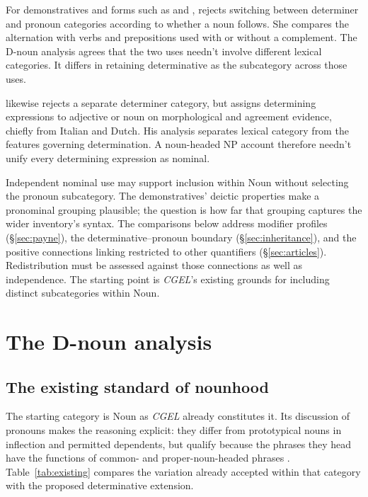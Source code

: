 \documentclass[12pt]{article}
\begin{document}
For demonstratives and forms such as  and , \textcite[140--144]{spinillo2004reconceptualising} rejects switching between determiner and pronoun categories according to whether a noun follows. She compares the alternation with verbs and prepositions used with or without a complement. The D-noun analysis agrees that the two uses needn't involve different lexical categories. It differs in retaining determinative as the subcategory across those uses.

\textcite{vaneynde2003determiner} likewise rejects a separate determiner category, but assigns determining expressions to adjective or noun on morphological and agreement evidence, chiefly from Italian and Dutch. His analysis separates lexical category from the features governing determination. A noun-headed NP account therefore needn't unify every determining expression as nominal.

Independent nominal use may support inclusion within Noun without selecting the pronoun subcategory. The demonstratives' deictic properties make a pronominal grouping plausible; the question is how far that grouping captures the wider inventory's syntax. The comparisons below address modifier profiles (§\ref{sec:payne}), the determinative--pronoun boundary (§\ref{sec:inheritance}), and the positive connections linking restricted  to other quantifiers (§\ref{sec:articles}). Redistribution must be assessed against those connections as well as independence. The starting point is \textit{CGEL}'s existing grounds for including distinct subcategories within Noun.

\section{The D-noun analysis}\label{sec:proposal}

\subsection{The existing standard of nounhood}\label{sec:membership}

The starting category is Noun as \textit{CGEL} already constitutes it. Its discussion of pronouns makes the reasoning explicit: they differ from prototypical nouns in inflection and permitted dependents, but qualify because the phrases they head have the functions of common- and proper-noun-headed phrases \citep[327]{huddleston2002}. Table~\ref{tab:existing} compares the variation already accepted within that category with the proposed determinative extension.
\end{document}
